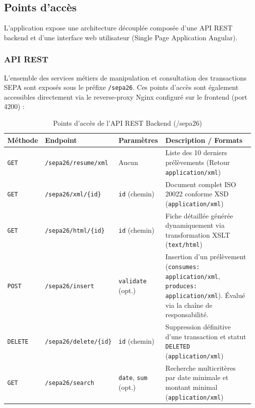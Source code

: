 \documentclass[12pt,a4paper]{article}
\begin{document}
\subsection{Points d'accès}

L'application expose une architecture découplée composée d'une API REST backend et d'une interface web utilisateur (Single Page Application Angular).

\subsubsection{API REST}
L'ensemble des services métiers de manipulation et consultation des transactions SEPA sont exposés sous le préfixe \texttt{/sepa26}. Ces points d'accès sont également accessibles directement via le reverse-proxy Nginx configuré sur le frontend (port 4200) :

\begin{table}[H]
    \centering
    \small
    \begin{tabularx}{\textwidth}{|l|l|l|Y|}
        \hline
        \textbf{Méthode} & \textbf{Endpoint} & \textbf{Paramètres} & \textbf{Description / Formats} \\
        \hline
        \texttt{GET} & \texttt{/sepa26/resume/xml} & Aucun & Liste des 10 derniers prélèvements (Retour \texttt{application/xml}) \\
        \hline
        \texttt{GET} & \texttt{/sepa26/xml/\{id\}} & \texttt{id} (chemin) & Document complet ISO 20022 conforme XSD (\texttt{application/xml}) \\
        \hline
        \texttt{GET} & \texttt{/sepa26/html/\{id\}} & \texttt{id} (chemin) & Fiche détaillée générée dynamiquement via transformation XSLT (\texttt{text/html}) \\
        \hline
        \texttt{POST} & \texttt{/sepa26/insert} & \texttt{validate} (opt.) & Insertion d'un prélèvement (\texttt{consumes: application/xml}, \texttt{produces: application/xml}). Évalué via la chaîne de responsabilité. \\
        \hline
        \texttt{DELETE} & \texttt{/sepa26/delete/\{id\}} & \texttt{id} (chemin) & Suppression définitive d'une transaction et statut \texttt{DELETED} (\texttt{application/xml}) \\
        \hline
        \texttt{GET} & \texttt{/sepa26/search} & \texttt{date}, \texttt{sum} (opt.) & Recherche multicritères par date minimale et montant minimal (\texttt{application/xml}) \\
        \hline
    \end{tabularx}
    \caption{Points d'accès de l'API REST Backend (/sepa26)}
\end{table}
\end{document}
